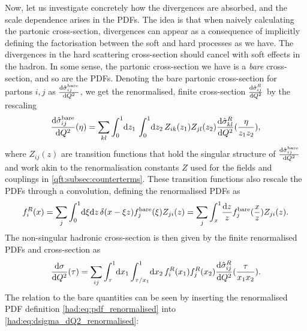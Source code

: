 \documentclass[../main.tex]{subfiles}
\begin{document}
Now, let us investigate concretely how the divergences are absorbed, and the scale dependence arises in the PDFs.
The idea is that when naively calculating the partonic cross-section, divergences can appear as a consequence of implicitly defining the factorisation between the soft and hard processes as we have.
The divergences in the hard scattering cross-section should cancel with soft effects in the hadron.
In some sense, the partonic cross-section we have is a \emph{bare} cross-section, and so are the PDFs.
Denoting the bare partonic cross-section for partons \(i, j\) as \(\d[Q^2]{\hat\sigma^\text{bare}_{ij}}\), we get the renormalised, finite cross-section \(\d[Q^2]{\hat\sigma^R_{ij}}\) by the rescaling
\begin{equation}
  \label{had:eq:renormalised_xsec}
  \d[Q^2]{\hat\sigma^\text{bare}_{ij}}(\eta) =\sum_{kl} \integral[_0^1]{z_1} \integral[_0^1]{z_2} Z_{ik}(z_1) Z_{jl}(z_2) \d[Q^2]{\hat\sigma^R_{kl}}(\frac{\eta}{z_1 z_2}),
\end{equation}
where \(Z_{ij}(z)\) are transition functions that hold the singular structure of \(\d[Q^2]{\hat\sigma^\text{bare}_{ij}}\) and work akin to the renormalisation constants \(Z\) used for the fields and couplings in \cref{qft:subsec:counterterms}.
These transition functions also rescale the PDFs through a convolution, defining the renormalised PDFs as
\begin{equation}
  \label{had:eq:pdf_renormalised}
  f_i^R(x) = \sum_{j} \integral[_0^1]{\xi \mathrm{d}z} \delta(x - \xi z) f_j^\text{bare}(\xi) Z_{ji}(z) = \sum_{j}\int_x^1 \! \frac{\mathrm{d}z}{z} f_j^\text{bare}(\frac{x}{z}) Z_{ji}(z).
\end{equation}
The non-singular hadronic cross-section is then given by the finite renormalised PDFs and cross-section as
\begin{equation}
  \label{had:eq:dsigma_dQ2_renormalised}
  \d[Q^2]{\sigma}(\tau) = \sum_ {ij} \integral[_\tau^1]{x_1}\!\integral[_{\tau/x_1}^1]{x_2} f_i^R(x_1) f_j^R(x_2) \d[Q^2]{\hat\sigma^R_{ij}}(\frac{\tau}{x_1 x_2}).
\end{equation}
The relation to the bare quantities can be seen by inserting the renormalised PDF definition \cref{had:eq:pdf_renormalised} into \cref{had:eq:dsigma_dQ2_renormalised}:
\end{document}
